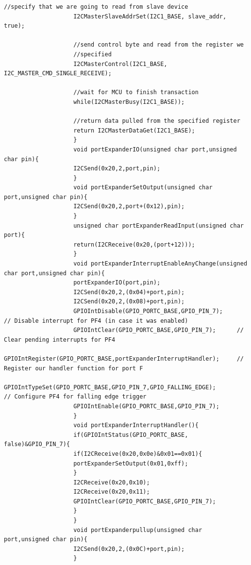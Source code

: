 \documentclass[a4paper,10pt,oneside]{article}
\begin{document}
\begin{lstlisting}[style=CStyle]
					//specify that we are going to read from slave device
					I2CMasterSlaveAddrSet(I2C1_BASE, slave_addr, true);
					
					//send control byte and read from the register we
					//specified
					I2CMasterControl(I2C1_BASE, I2C_MASTER_CMD_SINGLE_RECEIVE);
					
					//wait for MCU to finish transaction
					while(I2CMasterBusy(I2C1_BASE));
					
					//return data pulled from the specified register
					return I2CMasterDataGet(I2C1_BASE);
					}
					void portExpanderIO(unsigned char port,unsigned char pin){
					I2CSend(0x20,2,port,pin);
					}
					void portExpanderSetOutput(unsigned char port,unsigned char pin){
					I2CSend(0x20,2,port+(0x12),pin);
					}
					unsigned char portExpanderReadInput(unsigned char port){
					return(I2CReceive(0x20,(port+12)));
					}
					void portExpanderInterruptEnableAnyChange(unsigned char port,unsigned char pin){
					portExpanderIO(port,pin);
					I2CSend(0x20,2,(0x04)+port,pin);
					I2CSend(0x20,2,(0x08)+port,pin);
					GPIOIntDisable(GPIO_PORTC_BASE,GPIO_PIN_7);        // Disable interrupt for PF4 (in case it was enabled)
					GPIOIntClear(GPIO_PORTC_BASE,GPIO_PIN_7);      // Clear pending interrupts for PF4
					GPIOIntRegister(GPIO_PORTC_BASE,portExpanderInterruptHandler);     // Register our handler function for port F
					GPIOIntTypeSet(GPIO_PORTC_BASE,GPIO_PIN_7,GPIO_FALLING_EDGE);             // Configure PF4 for falling edge trigger
					GPIOIntEnable(GPIO_PORTC_BASE,GPIO_PIN_7);
					}
					void portExpanderInterruptHandler(){
					if(GPIOIntStatus(GPIO_PORTC_BASE, false)&GPIO_PIN_7){
					if(I2CReceive(0x20,0x0e)&0x01==0x01){
					portExpanderSetOutput(0x01,0xff);
					}
					I2CReceive(0x20,0x10);
					I2CReceive(0x20,0x11);
					GPIOIntClear(GPIO_PORTC_BASE,GPIO_PIN_7);
					}
					}
					void portExpanderpullup(unsigned char port,unsigned char pin){
					I2CSend(0x20,2,(0x0C)+port,pin);
					}
				\end{lstlisting}	
\end{document}
